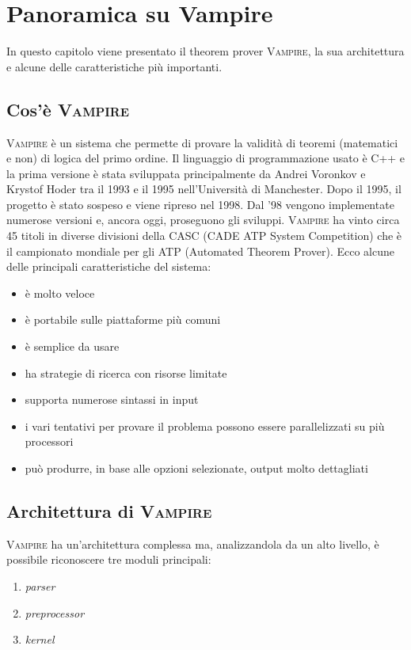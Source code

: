 \chapter{Panoramica su Vampire}
In questo capitolo viene presentato il theorem prover \textsc{Vampire}, la sua architettura e alcune
delle caratteristiche più importanti.

\section{Cos'è \textsc{Vampire}}
\textsc{Vampire} è un sistema che permette di provare la validità di teoremi (matematici e non) di logica del primo ordine. 
Il linguaggio di programmazione usato è C++ e la prima versione è stata sviluppata principalmente 
da Andrei Voronkov e Krystof Hoder tra il 1993 e il 1995 nell'Università di Manchester. Dopo il 1995, 
il progetto è stato sospeso e viene ripreso nel 1998. Dal '98 vengono implementate numerose versioni e, 
ancora oggi, proseguono gli sviluppi. \textsc{Vampire} ha vinto circa 45 titoli in diverse divisioni 
della CASC (CADE ATP System Competition) che è il campionato mondiale per gli ATP (Automated Theorem Prover)\cite{kovacs2013first,riazanov2002design}.
Ecco alcune delle principali caratteristiche del sistema:
\begin{itemize}
    \item è molto veloce
    \item è portabile sulle piattaforme più comuni
    \item è semplice da usare
    \item ha strategie di ricerca con risorse limitate
    \item supporta numerose sintassi in input
    \item i vari tentativi per provare il problema possono essere parallelizzati su più processori
    \item può produrre, in base alle opzioni selezionate, output molto dettagliati 
\end{itemize}
\section{Architettura di \textsc{Vampire}}
\textsc{Vampire} ha un'architettura complessa ma, analizzandola da un alto livello, è possibile riconoscere tre moduli 
principali:
\begin{enumerate}
    \item \emph{parser}
    \item \emph{preprocessor}
    \item \emph{kernel}
\end{enumerate}
\begin{figure}[H]
\end{figure}


